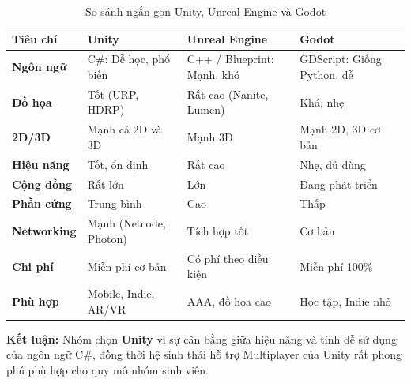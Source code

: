 \begin{table}[H]
\centering
\begin{tabular}{|p{2cm}|p{4cm}|p{4cm}|p{4cm}|}
\hline
\textbf{Tiêu chí} & \textbf{Unity} & \textbf{Unreal Engine} & \textbf{Godot} \\
\hline
\textbf{Ngôn ngữ} 
& C\#: Dễ học, phổ biến 
& C++ / Blueprint: Mạnh, khó 
& GDScript: Giống Python, dễ \\
\hline
\textbf{Đồ họa} 
& Tốt (URP, HDRP) 
& Rất cao (Nanite, Lumen) 
& Khá, nhẹ \\
\hline
\textbf{2D/3D} 
& Mạnh cả 2D và 3D 
& Mạnh 3D 
& Mạnh 2D, 3D cơ bản \\
\hline
\textbf{Hiệu năng} 
& Tốt, ổn định 
& Rất cao 
& Nhẹ, đủ dùng \\
\hline
\textbf{Cộng đồng} 
& Rất lớn 
& Lớn 
& Đang phát triển \\
\hline
\textbf{Phần cứng} 
& Trung bình 
& Cao 
& Thấp \\
\hline
\textbf{Networking} 
& Mạnh (Netcode, Photon) 
& Tích hợp tốt 
& Cơ bản \\
\hline
\textbf{Chi phí} 
& Miễn phí cơ bản 
& Có phí theo điều kiện 
& Miễn phí 100\% \\
\hline
\textbf{Phù hợp} 
& Mobile, Indie, AR/VR 
& AAA, đồ họa cao 
& Học tập, Indie nhỏ \\
\hline
\end{tabular}
\caption{So sánh ngắn gọn Unity, Unreal Engine và Godot}
\end{table}


\textbf{Kết luận:} Nhóm chọn \textbf{Unity} vì sự cân bằng giữa hiệu năng và tính dễ sử dụng của ngôn ngữ C\#, đồng thời hệ sinh thái hỗ trợ Multiplayer của Unity rất phong phú phù hợp cho quy mô nhóm sinh viên.